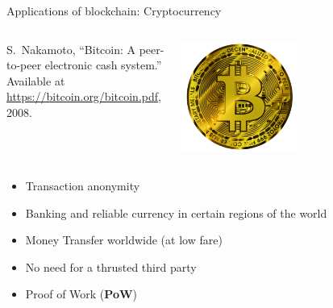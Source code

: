 \documentclass{beamer}
\begin{document}
\begin{frame}{Applications of blockchain: Cryptocurrency}
\begin{columns}
\begin{column}{0.5\textwidth}
   
{\footnotesize
\begin{thebibliography}{1}
S.~Nakamoto, ``Bitcoin: A peer-to-peer electronic cash system.'' Available at
  \href{https://bitcoin.org/bitcoin.pdf}{https://bitcoin.org/bitcoin.pdf},
  2008.
\end{thebibliography}  
}
\end{column}
\begin{column}{0.5\textwidth}  %
    \begin{center}
     \includegraphics[width=0.5\textwidth]{../../Figures/bitcoin-6284869_1920.png}
     \end{center}
\end{column}
\end{columns}

\begin{itemize}
  \item Transaction anonymity
  \item Banking and reliable currency in certain regions of the world
  \item Money Transfer worldwide (at low fare)
  \item No need for a thrusted third party
  \item Proof of Work (\textbf{PoW})
\end{itemize}
\end{frame}
\end{document}
